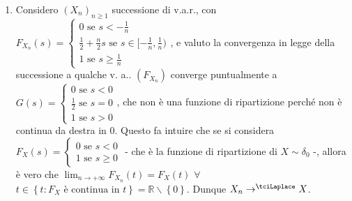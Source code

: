 \documentclass{article}
\begin{document}
\begin{enumerate}
\item Considero $\left( X_{n}\right) _{n\geq 1}$ successione di v.a.r., con $%
F_{X_{n}}\left( s\right) =\left\{ 
\begin{array}{c}
0\text{ se }s<-\frac{1}{n} \\ 
\frac{1}{2}+\frac{n}{2}s\text{ se }s\in \lbrack -\frac{1}{n},\frac{1}{n}) \\ 
1\text{ se }s\geq \frac{1}{n}%
\end{array}%
\right. $, e valuto la convergenza in legge della successione a qualche v.
a.. $\left( F_{X_{n}}\right) $ converge puntualmente a $G\left( s\right)
=\left\{ 
\begin{array}{c}
0\text{ se }s<0 \\ 
\frac{1}{2}\text{ se }s=0 \\ 
1\text{ se }s>0%
\end{array}%
\right. $, che non \`{e} una funzione di ripartizione perch\'{e} non \`{e}
continua da destra in $0$. Questo fa intuire che se si considera $%
F_{X}\left( s\right) =\left\{ 
\begin{array}{c}
0\text{ se }s<0 \\ 
1\text{ se }s\geq 0%
\end{array}%
\right. $ - che \`{e} la funzione di ripartizione di $X\sim \delta _{0}$ -,
allora \`{e} vero che $\lim_{n\rightarrow +\infty }F_{X_{n}}\left( t\right)
=F_{X}\left( t\right) $ $\forall $ $t\in \left\{ t:F_{X}\text{ \`{e}
continua in }t\right\} =%
\mathbb{R}
\backslash \left\{ 0\right\} $. Dunque $X_{n}\rightarrow ^{\tciLaplace }X$.


\end{enumerate}
\end{document}
